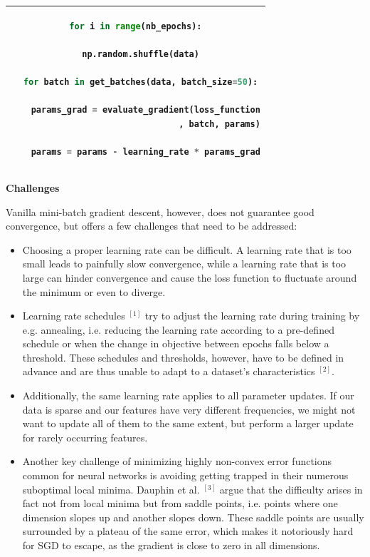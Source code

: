 \documentclass[4pt,journal,compsoc]{IEEEtran}
\begin{document}
\begin{flushleft}
        \begin{tabular}{|||c|} 
        \hline
        \begin{lstlisting}[language=Python]
for i in range(nb_epochs):

  np.random.shuffle(data)
  
  for batch in get_batches(data, batch_size=50):
                    
    params_grad = evaluate_gradient(loss_function
                                 , batch, params)
      
    params = params - learning_rate * params_grad
        \end{lstlisting} \\
        \hline
        \end{tabular} \newline \newline
    
    \textbf{\Large Challenges} \newline
    
    Vanilla mini-batch gradient descent, however, does not guarantee good convergence, but offers a few challenges that need to be addressed: \newline
    
    \begin{itemize}
        \item Choosing a proper learning rate can be difficult. A learning rate that is too small leads to painfully slow convergence, while a learning rate that is too large can hinder convergence and cause the loss function to fluctuate around the minimum or even to diverge.
        
        \item Learning rate schedules $^ {[1]}$ try to adjust the learning rate during training by e.g. annealing, i.e. reducing the learning rate according to a pre-defined schedule or when the change in objective between epochs falls below a threshold. These schedules and thresholds, however, have to be defined in advance and are thus unable to adapt to a dataset's characteristics $ ^ {[2]}$.
        
        \item Additionally, the same learning rate applies to all parameter updates. If our data is sparse and our features have very different frequencies, we might not want to update all of them to the same extent, but perform a larger update for rarely occurring features.
        
        \item Another key challenge of minimizing highly non-convex error functions common for neural networks is avoiding getting trapped in their numerous suboptimal local minima. Dauphin et al. $^ {[3]}$ argue that the difficulty arises in fact not from local minima but from saddle points, i.e. points where one dimension slopes up and another slopes down. These saddle points are usually surrounded by a plateau of the same error, which makes it notoriously hard for SGD to escape, as the gradient is close to zero in all dimensions. \newline \newline 
    \end{itemize} 
    

\end{flushleft}
\end{document}
